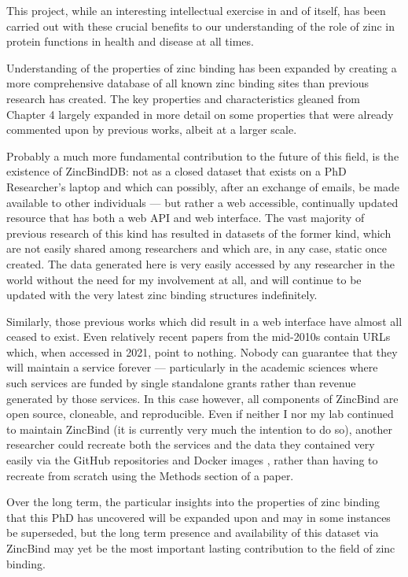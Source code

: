 This project, while an interesting intellectual exercise in and of itself, has been carried out with these crucial benefits to our understanding of the role of zinc in protein functions in health and disease at all times.

Understanding of the properties of zinc binding has been expanded by creating a more comprehensive database of all known zinc binding sites than previous research has created. The key properties and characteristics gleaned from Chapter 4 largely expanded in more detail on some properties that were already commented upon by previous works, albeit at a larger scale.

Probably a much more fundamental contribution to the future of this field, is the existence of ZincBindDB: not as a closed dataset that exists on a PhD Researcher's laptop and which can possibly, after an exchange of emails, be made available to other individuals ---  but rather a web accessible, continually updated resource that has both a web API and web interface. The vast majority of previous research of this kind has resulted in datasets of the former kind, which are not easily shared among researchers and which are, in any case, static once created. The data generated here is very easily accessed by any researcher in the world without the need for my involvement at all, and will continue to be updated with the very latest zinc binding structures indefinitely.

Similarly, those previous works which did result in a web interface have almost all ceased to exist. Even relatively recent papers from the mid-2010s contain URLs which, when accessed in 2021, point to nothing. Nobody can guarantee that they will maintain a service forever --- particularly in the academic sciences where such services are funded by single standalone grants rather than revenue generated by those services. In this case however, all components of ZincBind are open source, cloneable, and reproducible. Even if neither I nor my lab continued to maintain ZincBind (it is currently very much the intention to do so), another researcher could recreate both the services and the data they contained very easily via the GitHub repositories and Docker images \cite{githubdb,dockerdb}, rather than having to recreate from scratch using the Methods section of a paper.

Over the long term, the particular insights into the properties of zinc binding that this PhD has uncovered will be expanded upon and may in some instances be superseded, but the long term presence and availability of this dataset via ZincBind may yet be the most important lasting contribution to the field of zinc binding.

